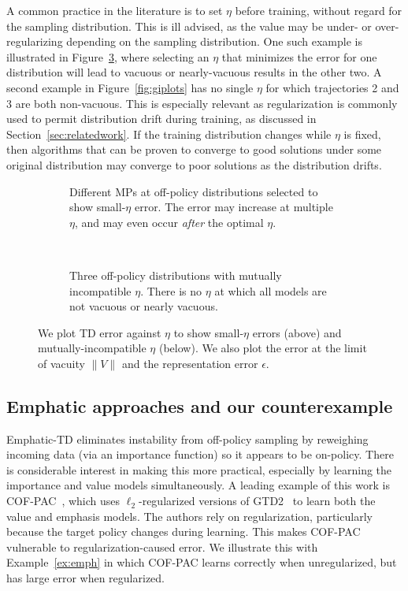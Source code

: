 A common practice in the literature is to set $\eta$ before training, without regard for the sampling distribution. This is ill advised, as the value may be under- or over-regularizing depending on the sampling distribution. One such example is illustrated in Figure~\ref{fig:mismatchedeta}, where selecting an $\eta$ that minimizes the error for one distribution will lead to vacuous or nearly-vacuous results in the other two. A second example in Figure~\ref{fig:giplots} has no single $\eta$ for which trajectories 2 and 3 are both non-vacuous. This is especially relevant as regularization is commonly used to permit distribution drift during training, as discussed in Section~\ref{sec:relatedwork}. If the training distribution changes while $\eta$ is fixed, then algorithms that can be proven to converge to good solutions under some original distribution may converge to poor solutions as the distribution drifts.

\begin{figure}
	\centering
	\begin{subfigure}[t]{0.8\columnwidth}
		\centering
		
		\caption{Different MPs at off-policy distributions selected to show small-$\eta$ error. The error may increase at multiple $\eta$, and may even occur \emph{after} the optimal $\eta$. }\label{fig:etagraph}
	\end{subfigure}
	\\

	\begin{subfigure}[t]{0.8\columnwidth}
		\centering
		
		\caption{Three off-policy distributions with mutually incompatible $\eta$. There is no $\eta$ at which all models are not vacuous or nearly vacuous. }\label{fig:mismatchedeta}
	\end{subfigure}
	\caption{We plot TD error against $\eta$ to show small-$\eta$ errors (above) and mutually-incompatible $\eta$ (below). We also plot the error at the limit of vacuity $\|V\|$ and the representation error $\epsilon$. }
\end{figure}

\subsection{Emphatic approaches and our counterexample}\label{sec:emphatictd}
Emphatic-TD eliminates instability from off-policy sampling by reweighing incoming data (via an importance function) so it appears to be on-policy. There is considerable interest in making this more practical, especially by learning the importance and value models simultaneously. A leading example of this work is COF-PAC~\cite{zhang2020provably}, which uses $\ell_2$-regularized versions of GTD2~\cite{sutton2009fast} to learn both the value and emphasis models. The authors rely on regularization, particularly because the target policy changes during learning. This makes COF-PAC vulnerable to regularization-caused error. We illustrate this with Example~\ref{ex:emph} in which COF-PAC learns correctly when unregularized, but has large error when regularized.


